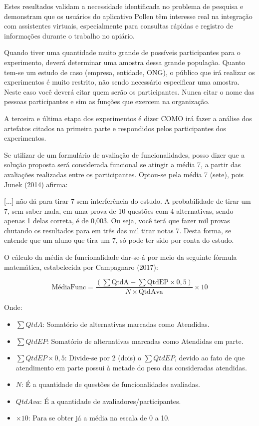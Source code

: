Estes resultados validam a necessidade identificada no problema de pesquisa e demonstram que os usuários do aplicativo Pollen têm interesse real na integração com assistentes virtuais, especialmente para consultas rápidas e registro de informações durante o trabalho no apiário.

Quando tiver uma quantidade muito grande de possíveis participantes para o experimento, deverá determinar uma amostra dessa grande população. Quanto tem-se um estudo de caso (empresa, entidade, ONG), o público que irá realizar os experimentos é muito restrito, não sendo necessário especificar uma amostra. Neste caso você deverá citar quem serão os participantes. Nunca citar o nome das pessoas participantes e sim as funções que exercem na organização.

A terceira e última etapa dos experimentos é dizer COMO irá fazer a análise dos artefatos citados na primeira parte e respondidos pelos participantes dos experimentos. 

Se utilizar de um formulário de avaliação de funcionalidades, posso dizer que a solução proposta será considerada funcional se atingir a média 7, a partir das avaliações realizadas entre os participantes. Optou-se pela média 7 (sete), pois Junek (2014) afirma:

[...] não dá para tirar 7 sem interferência do estudo. A probabilidade de tirar um 7, sem saber nada, em uma prova de 10 questões com 4 alternativas, sendo apenas 1 delas correta, é de 0,003. Ou seja, você terá que fazer mil provas chutando os resultados para em três das mil tirar notas 7. Desta forma, se entende que um aluno que tira um 7, só pode ter sido por conta do estudo.

O cálculo da média de funcionalidade dar-se-á por meio da seguinte fórmula matemática, estabelecida por Campagnaro (2017):

\begin{equation}
\text{MédiaFunc} = \frac{(\sum \text{QtdA} + \sum \text{QtdEP} \times 0,5)}{N \times \text{QtdAva}} \times 10
\end{equation}

Onde: 
\begin{itemize}
    \item $\sum QtdA$: Somatório de alternativas marcadas como Atendidas.
    \item $\sum QtdEP$: Somatório de alternativas marcadas como Atendidas em parte.
    \item $\sum QtdEP \times 0,5$: Divide-se por 2 (dois) o $\sum QtdEP$, devido ao fato de que atendimento em parte possui à metade do peso das consideradas atendidas.
    \item $N$: É a quantidade de questões de funcionalidades avaliadas.
    \item $QtdAva$: É a quantidade de avaliadores/participantes.
    \item $\times 10$: Para se obter já a média na escala de 0 a 10.
\end{itemize}

